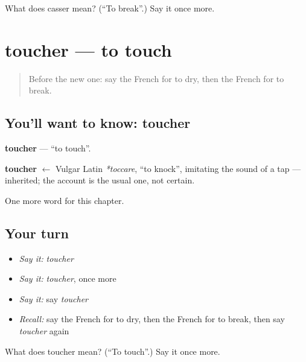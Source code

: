 \begin{tcolorbox}[breakable,colback=teal!4,colframe=teal!35!black,title={Before you move on}]
What does casser mean? (\textquotedblleft{}To break\textquotedblright{}.) Say it once more.
\end{tcolorbox}
\section[toucher]{toucher — to touch}

\label{lesson:FR-C206-toucher}



\begin{quote}
Before the new one: say the French for to dry, then the French for to break.
\end{quote}

\subsection*{You'll want to know: toucher}
\textbf{toucher} — \textquotedblleft{}to touch\textquotedblright{}.

\begin{cousinweb}
\textbf{toucher} $\leftarrow$ Vulgar Latin \emph{*toccare}, \textquotedblleft{}to knock\textquotedblright{}, imitating the sound of a tap — inherited; the account is the usual one, not certain.
\end{cousinweb}

\begin{grammarlens}[title={What you've built}]
One more word for this chapter.
\end{grammarlens}

\subsection*{Your turn}
\begin{itemize}
\raggedright
  \item \emph{Say it:} \emph{toucher}
  \item \emph{Say it:} \emph{toucher}, once more
  \item \emph{Say it:} say \emph{toucher}
  \item \emph{Recall:} say the French for to dry, then the French for to break, then say \emph{toucher} again
\end{itemize}

\begin{tcolorbox}[breakable,colback=teal!4,colframe=teal!35!black,title={Before you move on}]
What does toucher mean? (\textquotedblleft{}To touch\textquotedblright{}.) Say it once more.
\end{tcolorbox}
